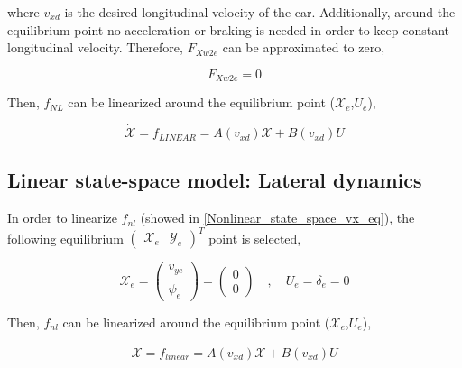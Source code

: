 \documentclass[12pt]{article}
\begin{document}
where $v_{xd}$ is the desired longitudinal velocity of the car. Additionally, around the equilibrium point no acceleration or braking is needed in order to keep constant longitudinal velocity. Therefore, $F_{Xw2e}$ can be approximated to zero,

\begin{equation}
    F_{Xw2e} = 0
\end{equation}

Then, $f_{NL}$ can be linearized around the equilibrium point ($\mathcal{X}_e$,$U_e$),

\begin{equation} \label{linear_expression_state}
    \dot{\mathcal{X}} = f_{LINEAR} = A (v_{xd}) \mathcal{X} + B (v_{xd}) U
\end{equation}

\subsection{Linear state-space model: Lateral dynamics}
In order to linearize $f_{nl}$ (showed in \eqref{Nonlinear_state_space_vx_eq}), the following equilibrium $ \begin{pmatrix} \mathcal{X}_e & \mathcal{Y}_e\end{pmatrix}^T$ point is selected,

\begin{equation}
    \mathcal{X}_e = \begin{pmatrix} v_{ye} \\ \Dot{\psi}_{e} \end{pmatrix} = \begin{pmatrix} 0 \\ 0  \end{pmatrix} \quad , \quad U_e =  \delta_{e} =  0 
\end{equation}

Then, $f_{nl}$ can be linearized around the equilibrium point ($\mathcal{X}_e$,$U_e$),

\begin{equation} \label{linear_expression_state}
    \dot{\mathcal{X}} = f_{linear} = A (v_{xd}) \mathcal{X} + B (v_{xd}) U
\end{equation}
\end{document}
